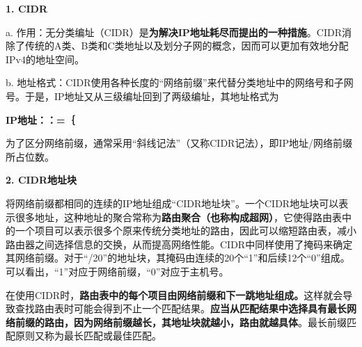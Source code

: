 \textbf{{1. CIDR}}

{a.
作用：无分类编址（CIDR）是{\textbf{{为解决IP地址耗尽而提出的一种措施}}}。CIDR消除了传统的A类、B类和C类地址以及划分子网的概念，因而可以更加有效地分配IPv4的地址空间。}

b.
地址格式：{CIDR使用各种长度的``网络前缀''来代替分类地址中的网络号和子网号。于是，IP地址又从三级编址回到了两级编址，其地址格式为}

\textbf{IP地址：：=｛}

为了区分网络前缀，通常采用``斜线记法''（又称CIDR记法），即IP地址/网络前缀所占位数。

\textbf{{2. CIDR地址块}}

将网络前缀都相同的连续的IP地址组成``CIDR地址块''。{一个CIDR地址块可以表示很多地址，这种地址的聚合常称为\textbf{{{路由聚合（也称构成超网）}}}，它使得路由表中的一个项目可以表示很多个原来传统分类地址的路由，因此可以缩短路由表，减小路由器之间选择信息的交换，从而提高网络性能。CIDR中同样使用了掩码来确定其网络前缀。对于``/20''的地址块，其掩码由连续的20个``1''和后续12个``0''组成。可以看出，``1''对应于网络前缀，``0''对应于主机号。}

在使用CIDR时，\textbf{{路由表中的每个项目由网络前缀和下一跳地址组成。}}这样就会导致查找路由表时可能会得到不止一个匹配结果。{\textbf{{应当从匹配结果中选择具有最长网络前缀的路由，因为网络前缀越长，其地址块就越小，路由就越具体}}}。最长前缀匹配原则又称为最长匹配或最佳匹配。
